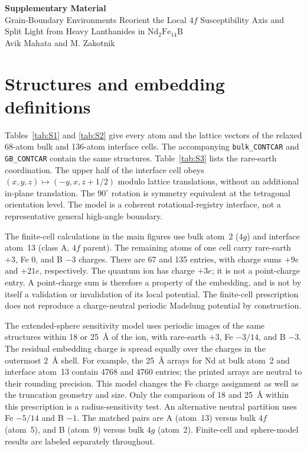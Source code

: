 \documentclass[11pt]{article}
\newcommand{\ndfeb}{\mathrm{Nd_2Fe_{14}B}}
\begin{document}
\begin{center}
{\Large\bfseries Supplementary Material}\\[6pt]
{\large Grain-Boundary Environments Reorient the Local $4f$ Susceptibility Axis and Split Light from Heavy Lanthanides in $\ndfeb$}\\[6pt]
Avik Mahata and M. Zakotnik
\end{center}

\section{Structures and embedding definitions}
Tables~\ref{tab:S1} and \ref{tab:S2} give every atom and the lattice vectors of the relaxed 68-atom bulk and 136-atom interface cells. The accompanying \texttt{bulk\_CONTCAR} and \texttt{GB\_CONTCAR} contain the same structures. Table~\ref{tab:S3} lists the rare-earth coordination. The upper half of the interface cell obeys $(x,y,z)\mapsto(-y,x,z+1/2)$ modulo lattice translations, without an additional in-plane translation. The $90^\circ$ rotation is symmetry equivalent at the tetragonal orientation level. The model is a coherent rotational-registry interface, not a representative general high-angle boundary.

The finite-cell calculations in the main figures use bulk atom~2 ($4g$) and interface atom~13 (class A, $4f$ parent). The remaining atoms of one cell carry rare-earth $+3$, Fe 0, and B $-3$ charges. There are 67 and 135 entries, with charge sums $+9e$ and $+21e$, respectively. The quantum ion has charge $+3e$; it is not a point-charge entry. A point-charge sum is therefore a property of the embedding, and is not by itself a validation or invalidation of its local potential. The finite-cell prescription does not reproduce a charge-neutral periodic Madelung potential by construction.

The extended-sphere sensitivity model uses periodic images of the same structures within 18 or 25~\AA{} of the ion, with rare-earth $+3$, Fe $-3/14$, and B $-3$. The residual embedding charge is spread equally over the charges in the outermost 2~\AA{} shell. For example, the 25~\AA{} arrays for Nd at bulk atom~2 and interface atom~13 contain 4768 and 4760 entries; the printed arrays are neutral to their rounding precision. This model changes the Fe charge assignment as well as the truncation geometry and size. Only the comparison of 18 and 25~\AA{} within this prescription is a radius-sensitivity test. An alternative neutral partition uses Fe $-5/14$ and B $-1$. The matched pairs are A (atom~13) versus bulk $4f$ (atom~5), and B (atom~9) versus bulk $4g$ (atom~2). Finite-cell and sphere-model results are labeled separately throughout.
\end{document}
